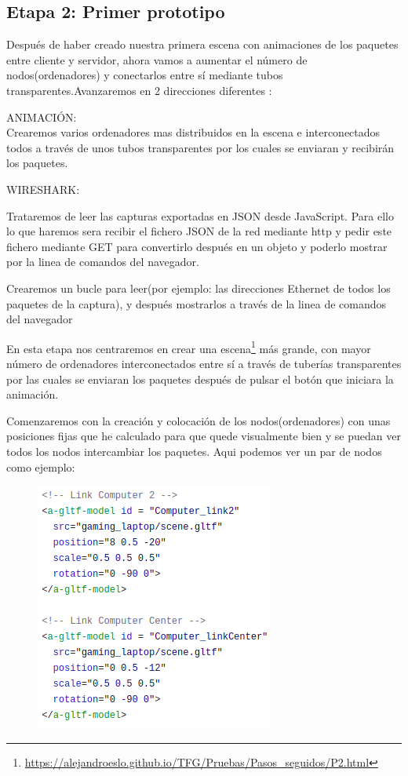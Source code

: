 \documentclass[a4paper, 12pt]{book}
\begin{document}
\subsection{Etapa 2: Primer prototipo}

Después de haber creado nuestra primera escena con animaciones de los paquetes entre cliente y servidor, ahora vamos a aumentar el número de nodos(ordenadores) y conectarlos entre sí mediante tubos transparentes.Avanzaremos en 2 direcciones diferentes :
\begin{flushleft}
ANIMACIÓN:
\\
Crearemos varios ordenadores mas distribuidos en la escena e interconectados todos a través 	de unos tubos transparentes por los cuales se enviaran y recibirán los paquetes.
\end{flushleft}

\begin{flushleft}
WIRESHARK:

Trataremos de leer las capturas exportadas en JSON desde JavaScript. Para ello lo que 	haremos sera recibir el fichero JSON de la red mediante http y pedir este fichero mediante 	GET para convertirlo después en un objeto y poderlo mostrar por la linea de comandos del 	navegador.

Crearemos un bucle para leer(por ejemplo: las direcciones Ethernet de todos los paquetes de la captura), y después mostrarlos a través de la linea de comandos del navegador

\end{flushleft}

En esta etapa nos centraremos en crear una escena\footnote{\url{https://alejandroeslo.github.io/TFG/Pruebas/Pasos_seguidos/P2.html}} más grande, con mayor número de ordenadores interconectados entre sí a través de tuberías transparentes por las cuales se enviaran los paquetes después de pulsar el botón que iniciara la animación.

Comenzaremos con la creación y colocación de los nodos(ordenadores) con unas posiciones fijas que he calculado para que quede visualmente bien y se puedan ver todos los nodos intercambiar los paquetes. Aqui podemos ver un par de nodos como ejemplo:

\begin{figure}[h]
\centering
    \includegraphics[scale=0.57]{img/paso2_1a.png}
\end{figure}
\end{document}
